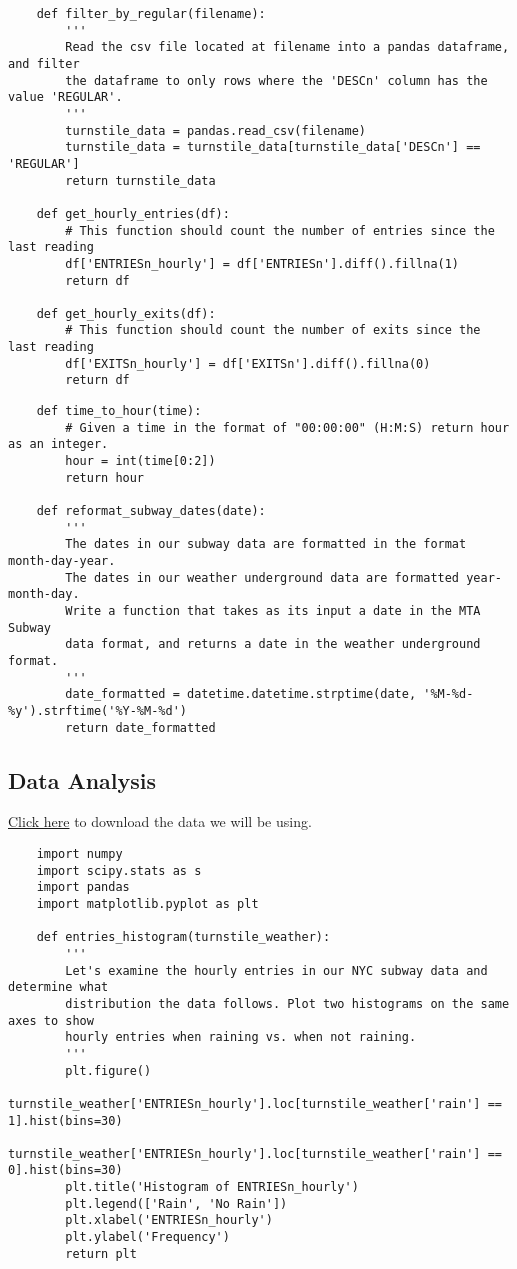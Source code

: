 \documentclass[11pt, a4paper]{article}
\begin{document}
\begin{spacing}{1.1}
\begin{lstlisting}
	def filter_by_regular(filename):
		'''
		Read the csv file located at filename into a pandas dataframe, and filter 
		the dataframe to only rows where the 'DESCn' column has the value 'REGULAR'.
		'''
		turnstile_data = pandas.read_csv(filename)
		turnstile_data = turnstile_data[turnstile_data['DESCn'] == 'REGULAR']
		return turnstile_data
	
	def get_hourly_entries(df):
		# This function should count the number of entries since the last reading
		df['ENTRIESn_hourly'] = df['ENTRIESn'].diff().fillna(1)
		return df
	
	def get_hourly_exits(df):
		# This function should count the number of exits since the last reading
		df['EXITSn_hourly'] = df['EXITSn'].diff().fillna(0)
		return df \end{lstlisting} \newpage

	\begin{lstlisting}
	def time_to_hour(time):
		# Given a time in the format of "00:00:00" (H:M:S) return hour as an integer.
		hour = int(time[0:2])
		return hour
	
	def reformat_subway_dates(date):
		'''
		The dates in our subway data are formatted in the format month-day-year.
		The dates in our weather underground data are formatted year-month-day.
		Write a function that takes as its input a date in the MTA Subway
		data format, and returns a date in the weather underground format.
		'''
		date_formatted = datetime.datetime.strptime(date, '%M-%d-%y').strftime('%Y-%M-%d')
		return date_formatted
	\end{lstlisting} \vspace*{1mm}
	
	\subsection{Data Analysis}
	\href{https://s3.amazonaws.com/content.udacity-data.com/courses/ud359/turnstile_data_master_with_weather.csv}{Click here} to download the data we will be using.
	\begin{lstlisting}
	import numpy
	import scipy.stats as s
	import pandas
	import matplotlib.pyplot as plt
	
	def entries_histogram(turnstile_weather):
		'''
		Let's examine the hourly entries in our NYC subway data and determine what
		distribution the data follows. Plot two histograms on the same axes to show 
		hourly entries when raining vs. when not raining.
		'''
		plt.figure()
		turnstile_weather['ENTRIESn_hourly'].loc[turnstile_weather['rain'] == 1].hist(bins=30)
		turnstile_weather['ENTRIESn_hourly'].loc[turnstile_weather['rain'] == 0].hist(bins=30)
		plt.title('Histogram of ENTRIESn_hourly')
		plt.legend(['Rain', 'No Rain'])
		plt.xlabel('ENTRIESn_hourly')
		plt.ylabel('Frequency')
		return plt
	

\end{lstlisting}
\end{spacing}
\end{document}
